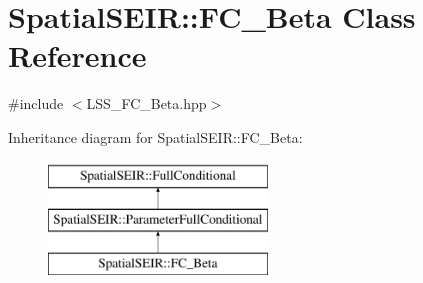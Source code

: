 \hypertarget{classSpatialSEIR_1_1FC__Beta}{\section{Spatial\-S\-E\-I\-R\-:\-:F\-C\-\_\-\-Beta Class Reference}
\label{classSpatialSEIR_1_1FC__Beta}
}


{\ttfamily \#include $<$L\-S\-S\-\_\-\-F\-C\-\_\-\-Beta.\-hpp$>$}

Inheritance diagram for Spatial\-S\-E\-I\-R\-:\-:F\-C\-\_\-\-Beta\-:\begin{figure}[H]
\begin{center}
\leavevmode
\includegraphics[height=3.000000cm]{classSpatialSEIR_1_1FC__Beta}
\end{center}
\end{figure}
